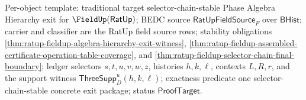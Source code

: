 Per-object template: traditional target selector-chain-stable Phase Algebra
Hierarchy exit for $\FieldUp(\mathsf{RatUp})$; BEDC source
$\mathsf{RatUpFieldSource}_F$ over $\mathsf{BHist}$; carrier and classifier are
the RatUp field source rows; stability obligations
\autoref{thm:ratup-fieldup-algebra-hierarchy-exit-witness},
\autoref{thm:ratup-fieldup-assembled-certificate-operation-table-coverage}, and
\autoref{thm:ratup-fieldup-selector-chain-final-boundary}; ledger selectors
$s,t,u,v,w,z$, histories $h,k,\ell$, contexts $L,R,r$, and the support witness
$\mathsf{ThreeSupp}_D^u(h,k,\ell)$; exactness predicate one selector-chain-stable
concrete exit package; status $\mathsf{ProofTarget}$.
